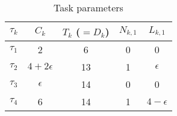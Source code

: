 \begin{table} 
\centering
\caption{Task parameters}
\begin{tabular}{|c|c|c|c|c|} \hline
$\tau_k$ & $C_k$ & $T_k$ ($= D_k$) & $N_{k,1}$ & $L_{k,1}$ \\ \hline
$\tau_1$ & 2           & 6  & 0 & 0 \\ \hline
$\tau_2$ & $4+2\epsilon$ & 13 & 1 & $\epsilon$ \\ \hline
$\tau_3$ & $\epsilon$    & 14 & 0 & 0 \\ \hline
$\tau_4$ & 6             & 14 & 1 & $4-\epsilon$ \\ \hline
\end{tabular}
\label{tab:parameters}
\end{table}

